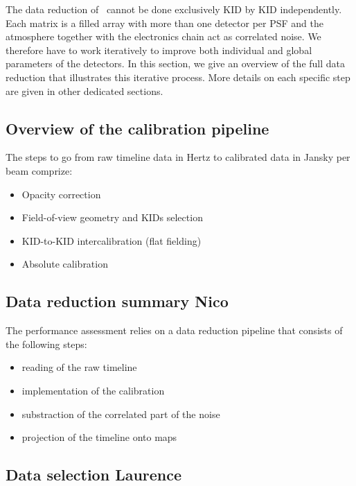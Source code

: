 
The data reduction of \nika\ cannot be done exclusively KID by KID
independently. Each matrix is a filled array with more than one detector per PSF
and the atmosphere together with the electronics chain act as correlated
noise. We therefore have to work iteratively to improve both individual and
global parameters of the detectors. In this section, we give an overview of the
full data reduction that illustrates this iterative process. More details on
each specific step are given in other dedicated sections.






\subsection{Overview of the calibration pipeline}

The steps to go from raw timeline data in Hertz to calibrated data in Jansky per beam comprize:
\begin{itemize}
\item[] Opacity correction
\item[] Field-of-view geometry and KIDs selection
\item[] KID-to-KID intercalibration (flat fielding)
\item[] Absolute calibration  
\end{itemize}


\subsection{Data reduction summary {\color{blue} Nico}}

The performance assessment relies on a data reduction pipeline that consists of the following steps:
\begin{itemize}
\item[] reading of the raw timeline 
\item[] implementation of the calibration
\item[] substraction of the correlated part of the noise 
\item[] projection of the timeline onto maps
\end{itemize}


\subsection{Data selection {\color{blue} Laurence}}
\label{se:data_selection}

